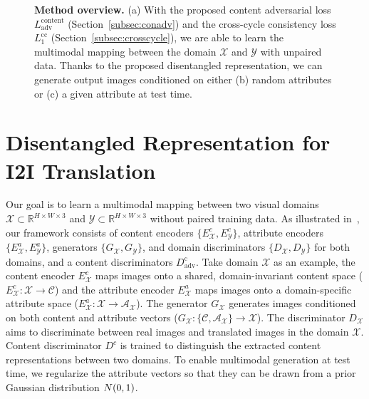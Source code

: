 \documentclass[runningheads]{llncs}
\renewcommand{\jiabin}[1]{}
\begin{document}
\begin{figure}[t]
\begin{minipage}[b]{0.409\textwidth}
{	}
    \end{minipage}
    \caption{\textbf{Method overview.} (a) With the proposed content adversarial loss $L_\mathrm{adv}^\mathrm{content}$ (Section~\ref{subsec:conadv}) and the cross-cycle consistency loss $L_1^\mathrm{cc}$ (Section~\ref{subsec:crosscycle}), we are able to learn the multimodal mapping between the domain $\mathcal{X}$ and $\mathcal{Y}$ with unpaired data. 
    Thanks to the proposed disentangled representation, we can generate output images conditioned on either (b) random attributes or (c) a given attribute at test time.}
    \label{figure:architecture}
    \vspace{\figmargin}
\end{figure}


\section{Disentangled Representation for I2I Translation}
\label{sec:framework}
\vspace{\secmargin}
%
Our goal is to learn a multimodal mapping between two visual domains $\mathcal{X} \subset \mathbb{R}^{H\times W \times 3}$ and $\mathcal{Y} \subset \mathbb{R}^{H\times W \times 3}$ without paired training data.
%
As illustrated in~, our framework consists of content encoders $\{E^c_\mathcal{X}, E^c_\mathcal{Y}\}$, attribute encoders $\{E^a_\mathcal{X}, E^a_\mathcal{Y}\}$, generators $\{G_\mathcal{X}, G_\mathcal{Y}\}$, and domain discriminators $\{D_\mathcal{X}, D_\mathcal{Y}\}$ for both domains, and a content discriminators $D_\mathrm{adv}^\mathrm{c}$.
%
Take domain $\mathcal{X}$ as an example, the content encoder $E^c_\mathcal{X}$ maps images onto a shared, domain-invariant content space ($E^c_\mathcal{X}:\mathcal{X}\to \mathcal{C}$) and the attribute encoder $E^a_\mathcal{X}$ maps images onto a domain-specific attribute space ($E^a_\mathcal{X}:\mathcal{X}\to \mathcal{A}_\mathcal{X}$).
%
The generator $G_\mathcal{X}$ generates images conditioned on both content and attribute vectors ($G_\mathcal{X}:\{\mathcal{C}, \mathcal{A}_\mathcal{X}\} \to \mathcal{X} $).
% 
The discriminator $D_\mathcal{X}$ aims to discriminate between real images and translated images in the domain $\mathcal{X}$.
%
Content discriminator $D^c$ is trained to distinguish the extracted content representations between two domains.
%
To enable multimodal generation at test time, we regularize the attribute vectors so that they can be drawn from a prior Gaussian distribution $\mathnormal{N}(0,1)$. 
\end{document}
